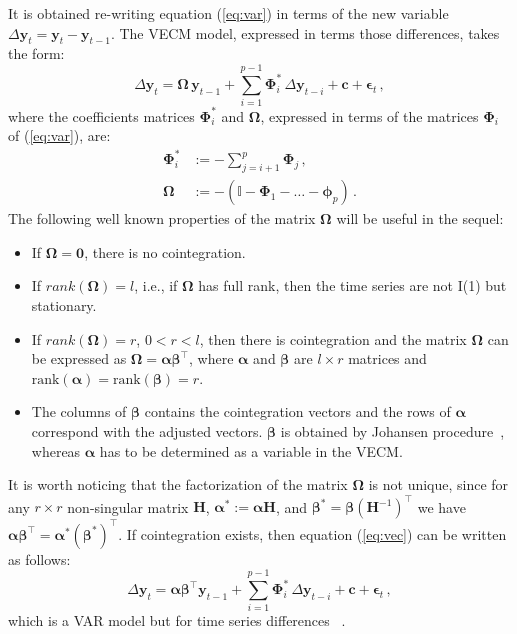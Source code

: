 \documentclass[twocolumn]{svjour3}          %
\begin{document}
It is obtained re-writing equation (\ref{eq:var}) in terms of the new
variable $\Delta\mathbf{y}_t=\mathbf{y}_t-\mathbf{y}_{t-1}$.
The VECM model, expressed in terms those differences, takes the form:
\begin{equation}\label{eq:vec}
\Delta \mathbf{y}_t 
= \boldsymbol{\Omega}\,\mathbf{y}_{t-1}
  + \sum_{i=1}^{p-1} \boldsymbol{\Phi}_i^*\,\Delta\mathbf{y}_{t-i}
  + \mathbf{c} + \boldsymbol{\epsilon}_t\,,
\end{equation}
\noindent
where the coefficients matrices $\boldsymbol{\Phi}_i^*$ and 
$\boldsymbol{\Omega}$, expressed in terms of the matrices
$\boldsymbol{\Phi}_i$ of (\ref{eq:var}), are:
\begin{align*}
\boldsymbol{\Phi}_i^* 
&:= -\sum_{j=i+1}^{p}\boldsymbol{\Phi}_j\,, \\
\boldsymbol{\Omega}
&:= -\left( \mathbb{I} - \boldsymbol{\Phi}_1 - \dots 
    - \boldsymbol{\phi}_p \right)\,. 
\end{align*}
The following well known properties of the matrix $\boldsymbol{\Omega}$
\cite{johansen1995} will be useful in the sequel:
\begin{itemize}
\item
If $\boldsymbol{\Omega} = \mathbf{0}$, there is no cointegration.
\item 
If $rank(\boldsymbol{\Omega})=l$, i.e., if $\boldsymbol{\Omega}$ has
full rank, then the time series are not I(1) but stationary.
\item
If $rank(\boldsymbol{\Omega})=r$, $0<r<l$, then there is cointegration
and the matrix $\boldsymbol{\Omega}$ can be expressed as
$\boldsymbol{\Omega}=\boldsymbol{\alpha\beta}^\top$, where $\boldsymbol{\alpha}$
and $\boldsymbol{\beta}$ are
$l\times r$ matrices and
$\text{rank}(\boldsymbol{\alpha})=\text{rank}(\boldsymbol{\beta})=r$.
\item
The columns of $\boldsymbol{\beta}$ contains the cointegration vectors and the rows of
$\boldsymbol{\alpha}$ correspond with the adjusted vectors. 
$\boldsymbol{\beta}$ is obtained by Johansen procedure~\cite{johansen1988},
whereas $\boldsymbol{\alpha}$ has to be determined as a variable in the VECM.
\end{itemize}
It is worth noticing that the factorization of the matrix
$\boldsymbol\Omega$ is not unique, since for any $r \times r$
non-singular matrix $\mathbf{H}$, $\boldsymbol{\alpha}^*:=\boldsymbol{\alpha}\mathbf{H}$,
and $\boldsymbol{\beta}^*=\boldsymbol{\beta}(\mathbf{H}^{-1})^\top$ we have
$\boldsymbol{\alpha\beta}^\top=\boldsymbol{\alpha}^*(\boldsymbol{\beta}^*)^\top$.
If cointegration exists, then equation (\ref{eq:vec}) can be written
as follows:
\begin{equation}\label{eq:vecfull}
\Delta\mathbf{y}_t 
= \boldsymbol{\alpha\beta}^\top\mathbf{y}_{t-1} 
  + \sum_{i=1}^{p-1}\boldsymbol{\Phi}_i^*\,\Delta\mathbf{y}_{t-i}
  + \mathbf{c} + \boldsymbol{\epsilon}_t\,,
\end{equation}
\noindent
which is a VAR model but for time series differences ~\cite{hansen1999}.
\end{document}
